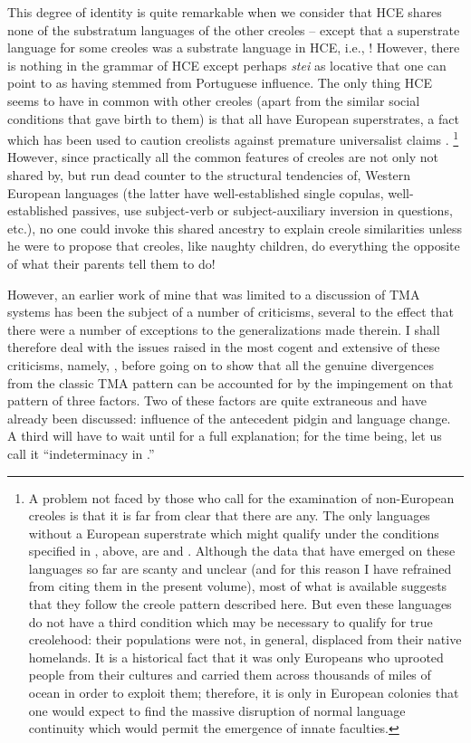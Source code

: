 This degree of identity is quite remarkable when we consider that HCE shares none of the substratum languages of the other creoles -- %
except that a superstrate language for some creoles was a substrate language in HCE, i.e., ! However, there is nothing in the grammar of HCE except perhaps \textit{stei} as locative that one can point to as having stemmed from Portuguese influence. The only thing HCE seems to have in common with other creoles (apart from the simi\-lar social conditions that gave birth to them) is that all have European superstrates, a fact which has been used to caution creolists against premature universalist claims \citep{Reinecke1977}.%
\footnote{A problem not faced by those who call for the examination of non-European creoles is that it is far from clear that there are any. The only languages without a European superstrate which might qualify under the conditions specified in , above, are  and . Although the data that have emerged on these lan\-guages so far are scanty and unclear (and for this reason I have refrained from citing them in the present volume), most of what is available suggests that they follow the creole pattern described here. But even these languages do not have a third condition which may be necessary to qualify for true creolehood: their populations were not, in general, displaced from their native homelands. It is a historical fact that it was only Europeans who uprooted people from their cultures and carried them across thousands of miles of ocean in order to exploit them; therefore, it is only in European colonies that one would expect to find the massive disruption of normal language continuity which would permit the emergence of innate faculties.} 
However, since practi\-cally all the common features of creoles are not only not shared by, but run dead counter to the structural tendencies of, Western Euro\-pean languages (the latter have well-established single copulas, well-established passives, use subject-verb or subject-auxiliary inversion in questions, etc.), no one could invoke this shared ancestry to explain creole similarities unless he were to propose that creoles, like naughty children, do everything the opposite of what their parents tell them to do!

However, an earlier work of mine \citep{Bickerton1974} that was limited to a discussion of TMA systems has been the subject of a number of criticisms, several to the effect that there were a number of exceptions to the generalizations made therein. I shall therefore deal with the issues raised in the most cogent and extensive of these criti\-cisms, namely, \citet{Muysken1981a}, before going on to show that all the genuine divergences from the classic TMA pattern can be accounted for by the impingement on that pattern of three factors. Two of these factors are quite extraneous and have already been discussed: influence of the antecedent pidgin and language change. A third will have to wait until  for a full explanation; for the time being, let us call it ``indeterminacy in .''

